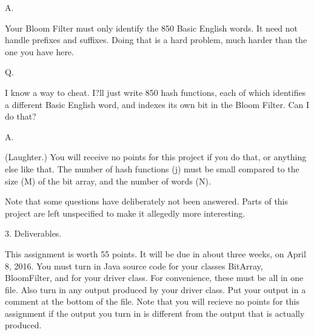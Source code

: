 A.  

Your Bloom Filter must only identify the 850 Basic English words. It need not handle prefixes and suffixes. Doing that is a hard problem, much harder than the one you have here.

Q.  

I know a way to cheat. I?ll just write 850 hash functions, each of which identifies a different Basic English word, and indexes its own bit in the Bloom Filter. Can I do that?

A.  

(Laughter.) You will receive no points for this project if you do that, or anything else like that. The number of hash functions (j) must be small compared to the size (M) of the bit array, and the number of words (N).

Note that some questions have deliberately not been answered. Parts of this project are left unspecified to make it allegedly more interesting.

3. Deliverables.

This assignment is worth 55 points. It will be due in about three weeks, on April 8, 2016. You must turn in Java source code for your classes BitArray, BloomFilter, and for your driver class. For convenience, these must be all in one file. Also turn in any output produced by your driver class. Put your output in a comment at the bottom of the file. Note that you will recieve no points for this assignment if the output you turn in is different from the output that is actually produced.